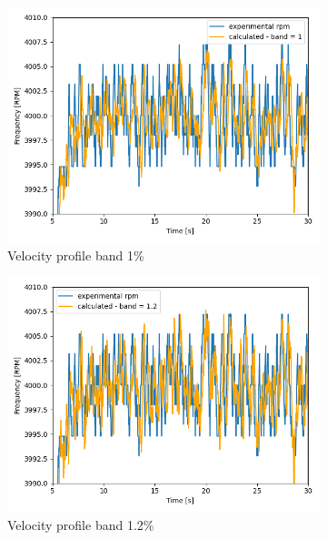 \documentclass[10pt,fleqn,a4paper,twoside]{article}
\begin{document}
\begin{figure}[H]
    \begin{subfigure}{0.4\textwidth}
        \includegraphics[width=\textwidth]{Figures/rpm_analysis_mic0_band_1.png}
        \caption{Velocity profile band 1\%}
        \label{fig:fourth}
    \end{subfigure}
    \centering
    \hfill
    \begin{subfigure}{0.4\textwidth}
        \includegraphics[width=\textwidth]{Figures/rpm_analysis_mic0_band_1.2.png}
        \caption{Velocity profile band 1.2\%}
        \label{fig:fifth}
    \end{subfigure}
    \centering
    \hfill
    \begin{subfigure}{0.4\textwidth}

\end{subfigure}
\end{figure}
\end{document}
